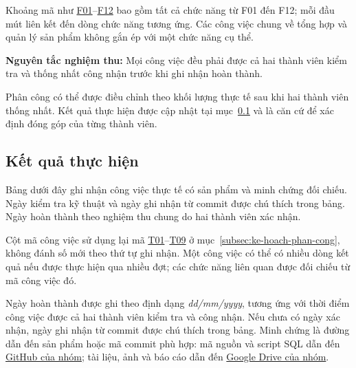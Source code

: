 Khoảng mã như \hyperlink{F01}{F01}--\hyperlink{F12}{F12} bao gồm tất cả
chức năng từ F01 đến F12; mỗi đầu mút liên kết đến dòng chức năng tương ứng.
Các công việc chung về tổng hợp và quản lý sản phẩm không gắn ép với
một chức năng cụ thể.

\noindent\textbf{Nguyên tắc nghiệm thu:}
Mọi công việc đều phải được cả hai thành viên kiểm tra và thống nhất
công nhận trước khi ghi nhận hoàn thành.

Phân công có thể được điều chỉnh theo khối lượng thực tế sau khi hai thành viên
thống nhất. Kết quả thực hiện được cập nhật tại mục~\ref{subsec:ket-qua-thuc-hien}
và là căn cứ để xác định đóng góp của từng thành viên.

\clearpage
\subsection{Kết quả thực hiện}
\label{subsec:ket-qua-thuc-hien}

Bảng dưới đây ghi nhận công việc thực tế có sản phẩm và minh chứng đối chiếu.
Ngày kiểm tra kỹ thuật và ngày ghi nhận từ commit được chú thích trong bảng.
Ngày hoàn thành theo nghiệm thu chung do hai thành viên xác nhận.

Cột mã công việc sử dụng lại mã \hyperlink{T01}{T01}--\hyperlink{T09}{T09}
ở mục~\ref{subsec:ke-hoach-phan-cong}, không đánh số mới theo
thứ tự ghi nhận. Một công việc có thể có nhiều dòng kết quả nếu được thực hiện
qua nhiều đợt; các chức năng liên quan được đối chiếu từ mã công việc đó.

Ngày hoàn thành được ghi theo định dạng \textit{dd/mm/yyyy}, tương ứng với thời điểm
công việc được cả hai thành viên kiểm tra và công nhận. Nếu chưa có ngày xác nhận,
ngày ghi nhận từ commit được chú thích trong bảng. Minh chứng là đường dẫn
đến sản phẩm hoặc mã commit phù hợp: mã nguồn và script SQL dẫn đến
\href{https://github.com/nguyenshai/Project-java}{GitHub của nhóm};
tài liệu, ảnh và báo cáo dẫn đến
\href{https://drive.google.com/drive/folders/1Kci4Ug_HXLRbBBFc0h6lVz0RbuvbcJTF?usp=sharing}
{Google Drive của nhóm}.

